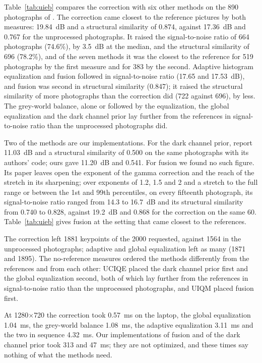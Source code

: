 Table~\ref{tab:uieb} compares the correction with six other methods on the 890
photographs of \cite{li2020uieb}. The correction came closest to the reference
pictures by both measures: 19.84~dB and a structural similarity of 0.874,
against 17.36~dB and 0.767 for the unprocessed photographs. It raised the
signal-to-noise ratio of 664 photographs (74.6\%), by 3.5~dB at the median, and
the structural similarity of 696 (78.2\%), and of the seven methods it was the
closest to the reference for 519 photographs by the first measure and for 383
by the second. Adaptive histogram equalization and fusion followed in
signal-to-noise ratio (17.65 and 17.53~dB), and fusion was second in structural
similarity (0.847); it raised the structural similarity of more photographs than
the correction did (722 against 696), by less. The grey-world balance, alone or
followed by the equalization, the global equalization and the dark channel prior
lay further from the references in signal-to-noise ratio than the unprocessed
photographs did.

Two of the methods are our implementations. For the dark channel prior,
\cite{li2020uieb} report 11.03~dB and a structural similarity of 0.500 on the
same photographs with its authors' code; ours gave 11.20~dB and 0.541. For
fusion we found no such figure. Its paper leaves open the exponent of the gamma
correction and the reach of the stretch in its sharpening; over exponents of
1.2, 1.5 and 2 and a stretch to the full range or between the 1st and 99th
percentiles, on every fifteenth photograph, its signal-to-noise ratio ranged
from 14.3 to 16.7~dB and its structural similarity from 0.740 to 0.828, against
19.2~dB and 0.868 for the correction on the same 60. Table~\ref{tab:uieb} gives
fusion at the setting that came closest to the references.

The correction left 1881 keypoints of the 2000 requested, against 1564 in the
unprocessed photographs; adaptive and global equalization left as many (1871 and
1895). The no-reference measures ordered the methods differently from the
references and from each other: UCIQE placed the dark channel prior first and
the global equalization second, both of which lay further from the references
in signal-to-noise ratio than the unprocessed photographs, and UIQM placed
fusion first.

At 1280$\times$720 the correction took 0.57~ms on the laptop, the global
equalization 1.04~ms, the grey-world balance 1.08~ms, the adaptive equalization
3.11~ms and the two in sequence 4.32~ms. Our implementations of fusion and of
the dark channel prior took 313 and 47~ms; they are not optimized, and these
times say nothing of what the methods need.

